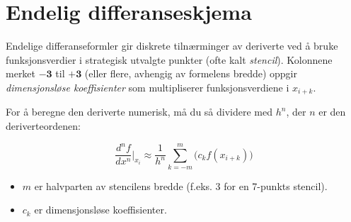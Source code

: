 \section*{Endelig differanseskjema}

Endelige differanseformler gir diskrete tilnærminger av deriverte ved å bruke funksjonsverdier i strategisk utvalgte punkter (ofte kalt \emph{stencil}).
Kolonnene merket \(\mathbf{-3}\) til \(\mathbf{+3}\) (eller flere, avhengig av formelens bredde) oppgir \emph{dimensjonsløse koeffisienter} som multipliserer funksjonsverdiene i \(x_{i + k}\).

For å beregne den deriverte numerisk, må du så dividere med \(h^n\), der \(n\) er den deriverteordenen:

\[
    \frac{d^n f}{dx^n} \Bigg|_{x_i} \approx \frac{1}{h^n} \sum_{k=-m}^{m} \bigl( c_k f(x_{i+k}) \bigr)
\]

\begin{itemize}
    \item \(m\) er halvparten av stencilens bredde (f.eks. 3 for en 7-punkts stencil).
    \item \(c_k\) er dimensjonsløse koeffisienter.
\end{itemize}

